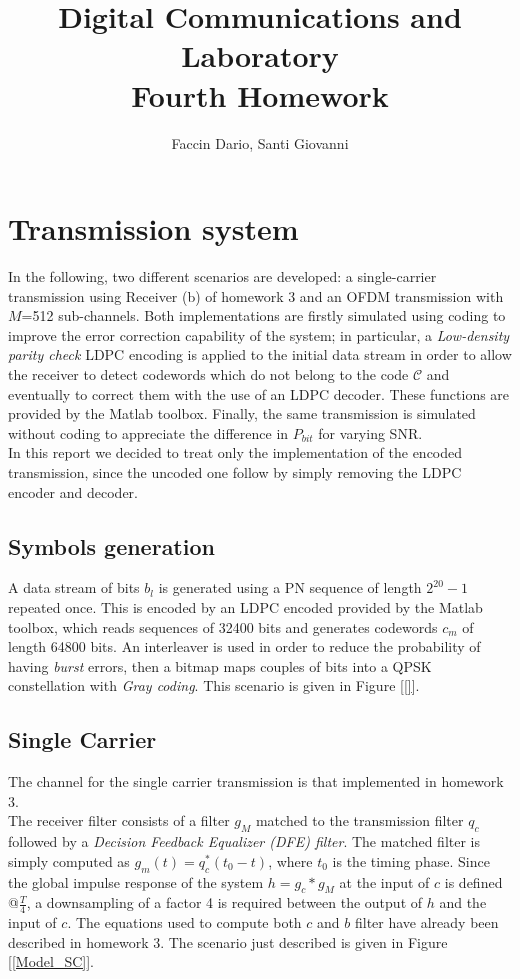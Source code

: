 \documentclass[a4paper, 12pt]{report}
\begin{document}
	
\title{Digital Communications and Laboratory \\ Fourth Homework}
\author{Faccin Dario, Santi Giovanni}
\date{}
\maketitle

\section*{Transmission system}
In the following, two different scenarios are developed: a single-carrier transmission using Receiver (b) of homework 3 and an OFDM transmission with $M$=512 sub-channels. Both implementations are firstly simulated using coding to improve the error correction capability of the system; in particular, a \textit{Low-density parity check} LDPC encoding is applied to the initial data stream in order to allow the receiver to detect codewords which do not belong to the code $\mathcal{C}$ and eventually to correct them with the use of an LDPC decoder. These functions are provided by the Matlab toolbox. Finally, the same transmission is simulated without coding to appreciate the difference in $P_{bit}$ for varying SNR. \\
In this report we decided to treat only the implementation of the encoded transmission, since the uncoded one follow by simply removing the LDPC encoder and decoder.

\subsection*{Symbols generation}
A data stream of bits $b_l$ is generated using a PN sequence of length $2^{20}-1$ repeated once. This is encoded by an LDPC encoded provided by the Matlab toolbox, which reads sequences of 32400 bits and generates codewords $c_m$ of length 64800 bits. An interleaver is used in order to reduce the probability of having \textit{burst} errors, then a bitmap maps couples of bits into a QPSK constellation with \textit{Gray coding}. This scenario is given in Figure [\ref{}].

\vspace{5em}

\subsection*{Single Carrier}
The channel for the single carrier transmission is that implemented in homework 3. \\
The receiver filter consists of a filter $g_M$ matched to the transmission filter $q_c$ followed by a \textit{Decision Feedback Equalizer (DFE) filter}. The matched filter is simply computed as $g_m(t) = q^*_c(t_0-t)$, where $t_0$ is the timing phase. 
Since the global impulse response of the system $h = g_c * g_M$ at the input of  $c$ is defined @$\frac{T}{4}$, a downsampling of a factor 4 is required between the output of $h$ and the input of $c$. The equations used to compute both $c$ and $b$ filter have already been described in homework 3. The scenario just described is given in Figure [\ref{Model_SC}].
\end{document}
